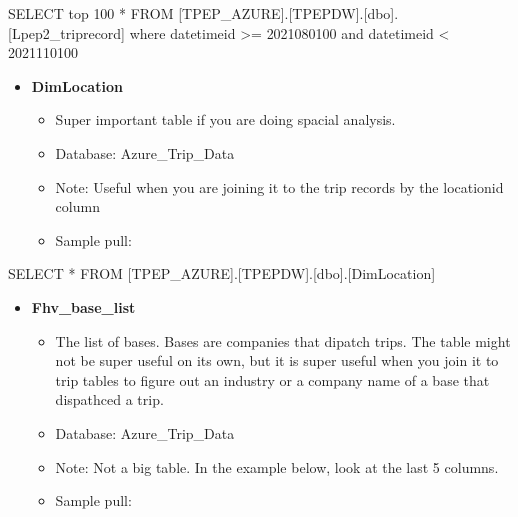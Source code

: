 \documentclass[
]{book}
\newenvironment{Shaded}{\begin{snugshade}}{\end{snugshade}}
\newcommand{\DecValTok}[1]{\textcolor[rgb]{0.00,0.00,0.81}{#1}}
\newcommand{\NormalTok}[1]{#1}
\newcommand{\SpecialCharTok}[1]{\textcolor[rgb]{0.00,0.00,0.00}{#1}}
\providecommand{\tightlist}{%
  \setlength{\itemsep}{0pt}\setlength{\parskip}{0pt}}
\begin{document}
\begin{Shaded}
\begin{Highlighting}[]
\NormalTok{SELECT top }\DecValTok{100} \SpecialCharTok{*}
\NormalTok{  FROM [TPEP\_AZURE].[TPEPDW].[dbo].[Lpep2\_triprecord]}
\NormalTok{  where datetimeid }\SpecialCharTok{\textgreater{}=} \DecValTok{2021080100}\NormalTok{ and datetimeid }\SpecialCharTok{\textless{}} \DecValTok{2021110100}
\end{Highlighting}
\end{Shaded}

\begin{itemize}
\tightlist
\item
  \textbf{DimLocation}

  \begin{itemize}
  \tightlist
  \item
    Super important table if you are doing spacial analysis.
  \item
    Database: Azure\_Trip\_Data
  \item
    Note: Useful when you are joining it to the trip records by the locationid column
  \item
    Sample pull:
  \end{itemize}
\end{itemize}

\begin{Shaded}
\begin{Highlighting}[]
\NormalTok{SELECT }\SpecialCharTok{*}
\NormalTok{  FROM [TPEP\_AZURE].[TPEPDW].[dbo].[DimLocation]}
\end{Highlighting}
\end{Shaded}

\begin{itemize}
\tightlist
\item
  \textbf{Fhv\_base\_list}

  \begin{itemize}
  \tightlist
  \item
    The list of bases. Bases are companies that dipatch trips. The table might not be super useful on its own, but it is super useful when you join it to trip tables to figure out an industry or a company name of a base that dispathced a trip.
  \item
    Database: Azure\_Trip\_Data
  \item
    Note: Not a big table. In the example below, look at the last 5 columns.
  \item
    Sample pull:
  \end{itemize}
\end{itemize}
\end{document}
